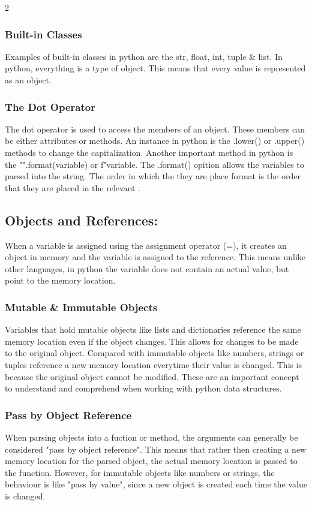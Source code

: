 \documentclass[a4paper]{report}
\begin{document}
\begin{flushleft}
\begin{multicols}{2}
	\subsubsection*{Built-in Classes}
	Examples of built-in classes in python are the str, float, int, tuple \& list. In python, everything is a type of object. This means that every value is represented as an object.
	\subsubsection*{The Dot Operator}
	The dot operator is used to access the members of an object. These members can be either attributes or methods. An instance in python is the .lower() or .upper() methods to change the capitalization. Another important method in python is the "{}".format(variable) or f"{variable}. The .format() opition allows the variables to parsed into the string. The order in which the they are place format is the order that they are placed in the relevant {}.

	\subsection*{Objects and References:}
	When a variable is assigned using the assignment operator (=), it creates an object in memory and the variable is assigned to the reference. This means unlike other languages, in python the variable does not contain an actual value, but point to the memory location.
	\subsubsection*{Mutable \& Immutable Objects}
	Variables that hold mutable objects like lists and dictionaries reference the same memory location even if the object changes. This allows for changes to be made to the original object. Compared with immutable objects like numbers, strings or tuples reference a new memory location everytime their value is changed. This is because the original object cannot be modified. These are an important concept to understand and comprehend when working with python data structures.
	\subsubsection*{Pass by Object Reference}
	When parsing objects into a fuction or method, the arguments can generally be considered "pass by object reference". This means that rather then creating a new memory location for the parsed object, the actual memory location is passed to the function. However, for immutable objects like numbers or strings, the behaviour is like "pass by value", since a new object is created each time the value is changed.
	

\end{multicols}
\end{flushleft}
\end{document}
